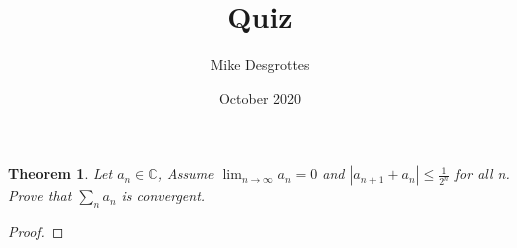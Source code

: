 \documentclass{article}
\title{Quiz}
\author{Mike Desgrottes}
\date{October 2020}
\theoremstyle{plain}
\newtheorem{theorem}{Theorem}
\theoremstyle{definition}
\begin{document}
\maketitle
\begin{theorem}
Let $a_{n} \in \mathbb{C}$, Assume $\lim_{n \to \infty} a_{n} = 0$ and $|a_{n+1} + a_{n}| \leq \frac{1}{2^{n}}$ for all n. Prove that $\sum_{n} a_{n}$ is convergent.
\end{theorem}

\begin{proof}
	
\end{proof}
\end{document}
